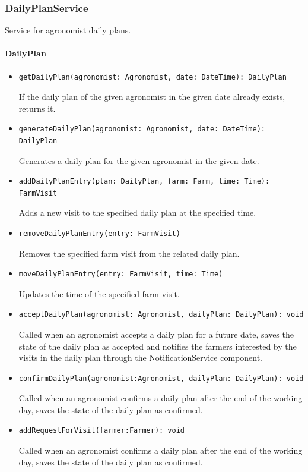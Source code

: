 \documentclass{article}
\begin{document}
\subsubsection{DailyPlanService}
Service for agronomist daily plans.

\paragraph{DailyPlan}
\begin{itemize}
\item \begin{verbatim}
getDailyPlan(agronomist: Agronomist, date: DateTime): DailyPlan
\end{verbatim}
If the daily plan of the given agronomist in the given date already exists, returns it.
\item \begin{verbatim}
generateDailyPlan(agronomist: Agronomist, date: DateTime): DailyPlan
\end{verbatim}
Generates a daily plan for the given agronomist in the given date.
\item \begin{verbatim}
addDailyPlanEntry(plan: DailyPlan, farm: Farm, time: Time): FarmVisit
\end{verbatim}
Adds a new visit to the specified daily plan at the specified time.
\item \begin{verbatim}
removeDailyPlanEntry(entry: FarmVisit)
\end{verbatim}
Removes the specified farm visit from the related daily plan.
\item \begin{verbatim}
moveDailyPlanEntry(entry: FarmVisit, time: Time)
\end{verbatim}
Updates the time of the specified farm visit.
\item \begin{verbatim}
acceptDailyPlan(agronomist: Agronomist, dailyPlan: DailyPlan): void
\end{verbatim}
Called when an agronomist accepts a daily plan for a future date, saves the state of the daily plan as accepted and notifies the farmers interested by the visits in the daily plan through the NotificationService component.
\item\begin{verbatim}
confirmDailyPlan(agronomist:Agronomist, dailyPlan: DailyPlan): void
\end{verbatim}
Called when an agronomist confirms a daily plan after the end of the working day, saves the state of the daily plan as confirmed.
\item\begin{verbatim}
addRequestForVisit(farmer:Farmer): void
\end{verbatim}
Called when an agronomist confirms a daily plan after the end of the working day, saves the state of the daily plan as confirmed.
\end{itemize}
\end{document}
